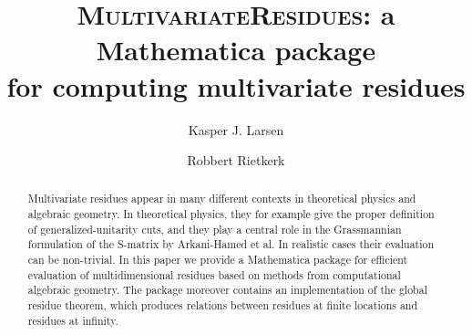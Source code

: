 \documentclass[dvipsnames,preprint,12pt,sort&compress]{elsarticle}
\begin{document}
\begin{frontmatter}



\title{\textsc{MultivariateResidues:} a Mathematica package \\ for computing multivariate residues}



\author[a,b]{Kasper J. Larsen}
\author[c,d,e]{Robbert Rietkerk}


\address[a]{Institute for Theoretical Physics, ETH Z{\"u}rich, 8093 Z{\"u}rich, Switzerland}
\address[b]{School of Physics and Astronomy, University of Southampton, \\ Highfield, Southampton, SO17 1BJ, United Kingdom}

\address[c]{Nikhef, Theory Group, Science Park 105, 1098 XG Amsterdam, The Netherlands}
\address[d]{Institute for Theoretical Physics, University of Amsterdam, Science Park 904, \\ 1098 XH Amsterdam, The Netherlands}
\address[e]{Institute for Theoretical Particle Physics, KIT, Wolfgang-Gaede-Strasse 1, \\ 76128 Karlsruhe, Germany}


\begin{abstract}
Multivariate residues appear in many different contexts
in theoretical physics and algebraic geometry. In theoretical physics,
they for example give the proper definition of generalized-unitarity cuts,
and they play a central role in the Grassmannian formulation of the S-matrix
by Arkani-Hamed et al. In realistic cases their evaluation can be non-trivial.
In this paper we provide a Mathematica package for efficient evaluation
of multidimensional residues based on methods from computational algebraic geometry.
The package moreover contains an implementation of the global residue theorem,
which produces relations between residues at finite locations and residues at infinity.
\end{abstract}


\end{frontmatter}
\end{document}
